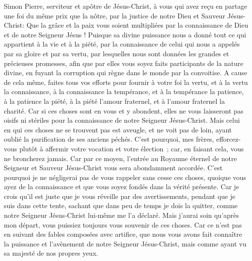 \begin{multicols}{2}
\VerseOne{}Simon Pierre, serviteur et apôtre de Jésus-Christ, à vous qui avez reçu en partage une foi du même prix que la nôtre, par la justice de notre Dieu et Sauveur Jésus-Christ:
Que la grâce et la paix vous soient multipliées par la connaissance de Dieu et de notre Seigneur Jésus !
Puisque sa divine puissance nous a donné tout ce qui appartient à la vie et à la piété, par la connaissance de celui qui nous a appelés par sa gloire et par sa vertu,
par lesquelles nous sont données les grandes et précieuses promesses, afin que par elles vous soyez faits participants de la nature divine, en fuyant la corruption qui règne dans le monde par la convoitise.
A cause de cela même, faites tous vos efforts pour fournir à votre foi la vertu, et à la vertu la connaissance,
à la connaissance la tempérance, et à la tempérance la patience, à la patience la piété,
à la piété l'amour fraternel, et à l'amour fraternel la charité.
Car si ces choses sont en vous et y abondent, elles ne vous laisseront pas oisifs ni stériles pour la connaissance de notre Seigneur Jésus-Christ.
Mais celui en qui ces choses ne se trouvent pas est aveugle, et ne voit pas de loin, ayant oublié la purification de ses anciens péchés.
C'est pourquoi, mes frères, efforcez-vous plutôt à affermir votre vocation et votre élection~; car, en faisant cela, vous ne broncherez jamais.
Car par ce moyen, l'entrée au Royaume éternel de notre Seigneur et Sauveur Jésus-Christ vous sera abondamment accordée.
C'est pourquoi je ne négligerai pas de vous rappeler sans cesse ces choses, quoique vous ayez de la connaissance et que vous soyez fondés dans la vérité présente.
Car je crois qu'il est juste que je vous réveille par des avertissements, pendant que je suis dans cette tente,
sachant que dans peu de temps je dois la quitter, comme notre Seigneur Jésus-Christ lui-même me l'a déclaré.
Mais j'aurai soin qu'après mon départ, vous puissiez toujours vous souvenir de ces choses.
Car ce n'est pas en suivant des fables composées avec artifice, que nous vous avons fait connaître la puissance et l'avènement de notre Seigneur Jésus-Christ, mais comme ayant vu sa majesté de nos propres yeux.

\end{multicols}
